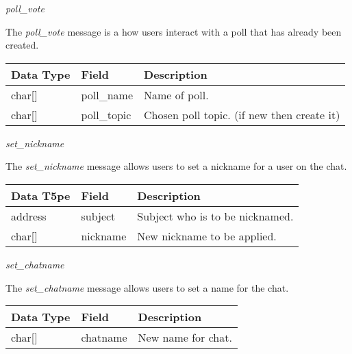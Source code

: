 \documentclass{article}
\begin{document}
\begin{center}
    \large{\textit{poll\_vote}}
\end{center}
The \textit{poll\_vote} message is a how users interact with a poll that has already been created.
\begin{table}[H]
\centering
\begin{tabular}{|p{1.3cm}|p{2.5cm}|p{5.5cm}|}
\hline
\rowcolor{tblgrey} 
Data Type & Field           & Description                                               \\ \hline
char[\hspace{0.05cm}] & poll\_name      & Name of poll.                                             \\ \hline
char[\hspace{0.05cm}] & poll\_topic     & Chosen poll topic. (if new then create it)                \\ \hline
\end{tabular}
\end{table}

\begin{center}
    \large{\textit{set\_nickname}}
\end{center}
The \textit{set\_nickname} message allows users to set a nickname for a user on the chat.
\begin{table}[H]
\centering
\begin{tabular}{|p{1.3cm}|p{2.5cm}|p{5.5cm}|}
\hline
\rowcolor{tblgrey} 
Data T5pe       & Field           & Description                                               \\ \hline
address         & subject         & Subject who is to be nicknamed.                           \\ \hline
char[\hspace{0.05cm}] & nickname        & New nickname to be applied.                               \\ \hline
\end{tabular}
\end{table}

\begin{center}
    \large{\textit{set\_chatname}}
\end{center}
The \textit{set\_chatname} message allows users to set a name for the chat.
\begin{table}[H]
\centering
\begin{tabular}{|p{1.3cm}|p{2.5cm}|p{5.5cm}|}
\hline
\rowcolor{tblgrey} 
Data Type       & Field           & Description                                               \\ \hline
char[\hspace{0.05cm}] & chatname        & New name for chat.                                        \\ \hline
\end{tabular}
\end{table}
\end{document}
